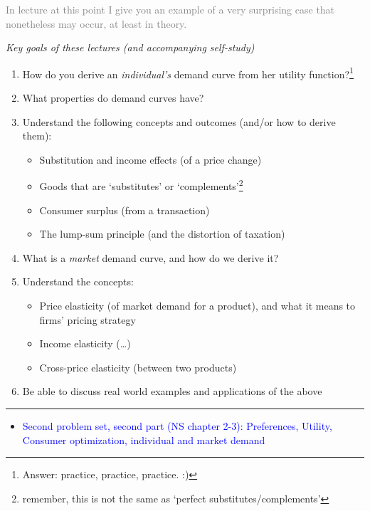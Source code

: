 \documentclass[]{article}
\providecommand{\tightlist}{%
  \setlength{\itemsep}{0pt}\setlength{\parskip}{0pt}}
\begin{document}
\textcolor{gray}{In lecture at this point I give you an example of a very surprising case that nonetheless may occur, at least in theory.}

\emph{Key goals of these lectures (and accompanying self-study)}

\begin{enumerate}
\def\labelenumi{\arabic{enumi}.}
\tightlist
\item
  How do you derive an \emph{individual's} demand curve from her utility
  function?\footnote{Answer: practice, practice, practice. :)}
\item
  What properties do demand curves have?
\item
  Understand the following concepts and outcomes (and/or how to derive
  them):

  \begin{itemize}
  \tightlist
  \item
    Substitution and income effects (of a price change)
  \item
    Goods that are `substitutes' or `complements'\footnote{remember,
      this is not the same as `perfect substitutes/complements'}
  \item
    Consumer surplus (from a transaction)
  \item
    The lump-sum principle (and the distortion of taxation)
  \end{itemize}
\item
  What is a \emph{market} demand curve, and how do we derive it?
\item
  Understand the concepts:

  \begin{itemize}
  \tightlist
  \item
    Price elasticity (of market demand for a product), and what it means
    to firms' pricing strategy
  \item
    Income elasticity (\ldots)
  \item
    Cross-price elasticity (between two products)
  \end{itemize}
\item
  Be able to discuss real world examples and applications of the above
\end{enumerate}

\begin{center}\rule{0.5\linewidth}{\linethickness}\end{center}

\begin{itemize}
\tightlist
\item
  \textcolor{blue}{Second problem set, second part (NS chapter 2-3): Preferences, Utility, Consumer optimization, individual and market demand}
\end{itemize}
\end{document}
